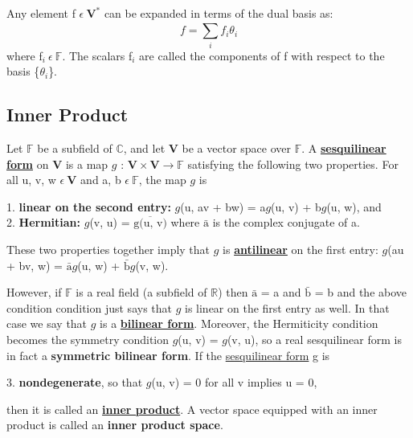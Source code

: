 Any element f $\epsilon \: \textbf{V}^ \ast$ can be expanded in terms of the dual basis as:
\begin{equation}
    f = \sum_{i}^{} f_i\theta_i
\end{equation}
where f$_i \: \epsilon \: \mathbb{F}$. The scalars f$_i$ are called the components of f with respect to the
basis \{$\theta_i$\}.

\newpage
\subsection{Inner Product}
Let $\mathbb{F}$ be a subfield of $\mathbb{C}$, and let $\textbf{V}$ be a vector space over $\mathbb{F}$. A \href{https://math.stackexchange.com/questions/2709888/what-is-a-sesquilinear-form}{\textbf{sesquilinear form}}
on $\textbf{V}$ is a map $\textit{g}$ : $\textbf{V} \times \textbf{V} \rightarrow \mathbb{F}$ satisfying the following two properties. For
all u, v, w $\epsilon \: \textbf{V}$ and a, b $\epsilon \: \mathbb{F}$, the map $\textit{g}$ is

1. \textbf{linear on the second entry:} $\textit{g}$(u, av + bw) = a$\textit{g}$(u, v) + b$\textit{g}$(u, w), and \\
2. \textbf{Hermitian:} $\textit{g}$(v, u) = $\overline{\text{g(u, v)}}$
where $\bar{\text{a}}$ is the complex conjugate of a.

These two properties together imply that $\textit{g}$ is \href{https://en.wikipedia.org/wiki/Antilinear_map#:~:text=5%20Citations-,Definitions%20and%20characterizations,is%20called%20conjugate%20homogeneous%20if}{\textbf{antilinear}} on the first entry: $\textit{g}$(au + bv, w) = $\bar{\text{a}}$$\textit{g}$(u, w) + $\bar{\text{b}}$$\textit{g}$(v, w).

However, if $\mathbb{F}$ is a real field (a subfield of $\mathbb{R}$) then $\bar{\text{a}}$ = a and $\bar{\text{b}}$ = b and the above
condition condition just says that $\textit{g}$ is linear on the first entry as well. In that case
we say that $\textit{g}$ is a \href{https://en.wikipedia.org/wiki/Bilinear_form}{\textbf{bilinear form}}. Moreover, the Hermiticity condition becomes
the symmetry condition $\textit{g}$(u, v) = $\textit{g}$(v, u), so a real sesquilinear form is in fact a
\textbf{symmetric bilinear form}. If the \href{https://en.wikipedia.org/wiki/Sesquilinear_form}{sesquilinear form} g is

3. \textbf{nondegenerate}, so that $\textit{g}$(u, v) = 0 for all v implies u = 0,

then it is called an \href{https://math.stackexchange.com/questions/56/what-is-an-inner-product-space}{\textbf{inner product}}. 
A vector space equipped with an inner product is called an \textbf{inner product space}.

\newpage

